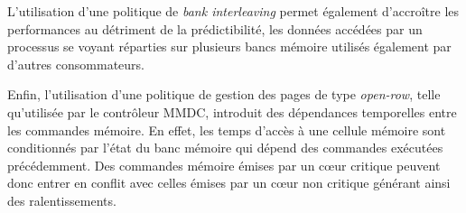             L'utilisation d'une politique de \emph{bank interleaving} permet également d'accroître les performances au détriment de la prédictibilité, les données accédées par un processus se voyant réparties sur plusieurs bancs mémoire utilisés également par d'autres consommateurs.

            Enfin, l'utilisation d'une politique de gestion des pages de type \emph{open-row}, telle qu'utilisée par le contrôleur MMDC, introduit des dépendances temporelles entre les commandes mémoire. En effet, les temps d'accès à une cellule mémoire sont conditionnés par l'état du banc mémoire qui dépend des commandes exécutées précédemment. Des commandes mémoire émises par un cœur critique peuvent donc entrer en conflit avec celles émises par un cœur non critique générant ainsi des ralentissements.

